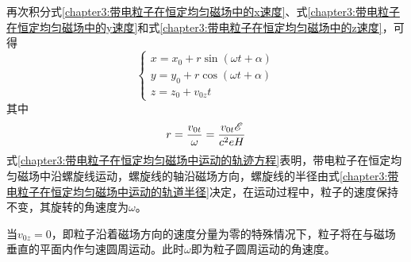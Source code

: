 再次积分式\eqref{chapter3:带电粒子在恒定均匀磁场中的x速度}、式\eqref{chapter3:带电粒子在恒定均匀磁场中的y速度}和式\eqref{chapter3:带电粒子在恒定均匀磁场中的z速度}，可得
\begin{equation}
\begin{cases}
	x = x_0 + r \sin(\omega t+\alpha) \\
	y = y_0 + r \cos(\omega t+\alpha) \\
	z = z_0 + v_{0z}t
\end{cases}
\label{chapter3:带电粒子在恒定均匀磁场中运动的轨迹方程}
\end{equation}
其中
\begin{equation}
	r = \dfrac{v_{0t}}{\omega} = \dfrac{v_{0t}\mathscr{E}}{c^2eH}
	\label{chapter3:带电粒子在恒定均匀磁场中运动的轨道半径}
\end{equation}
式\eqref{chapter3:带电粒子在恒定均匀磁场中运动的轨迹方程}表明，带电粒子在恒定均匀磁场中沿螺旋线运动，螺旋线的轴沿磁场方向，螺旋线的半径由式\eqref{chapter3:带电粒子在恒定均匀磁场中运动的轨道半径}决定，在运动过程中，粒子的速度保持不变，其旋转的角速度为$\omega$。

当$v_{0z}=0$，即粒子沿着磁场方向的速度分量为零的特殊情况下，粒子将在与磁场垂直的平面内作匀速圆周运动。此时$\omega$即为粒子圆周运动的角速度。

